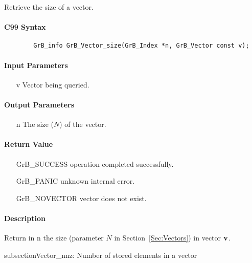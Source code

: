 Retrieve the size of a vector.

\paragraph{C99 Syntax}

\begin{verbatim}
        GrB_info GrB_Vector_size(GrB_Index *n, GrB_Vector const v);
\end{verbatim}

\paragraph{Input Parameters}

\begin{itemize}[leftmargin=1.1in]
    \item[{\sf v}] Vector being queried.
\end{itemize}

\paragraph{Output Parameters}
\begin{itemize}[leftmargin=1.1in]
    \item[{\sf n}] The size ($N$) of the vector.
\end{itemize}

\paragraph{Return Value}

\begin{itemize}[leftmargin=2.1in]
\item[{\sf GrB\_SUCCESS}]   operation completed successfully.
\item[{\sf GrB\_PANIC}]     unknown internal error.
\item[{\sf GrB\_NOVECTOR}]  vector does not exist.
\end{itemize}

\paragraph{Description}

Return in {\sf n} the size (parameter $N$ in Section~\ref{Sec:Vectors}) in vector ${\bf v}$.

subsection{{\sf Vector\_nnz}: Number of stored elements in a vector}

